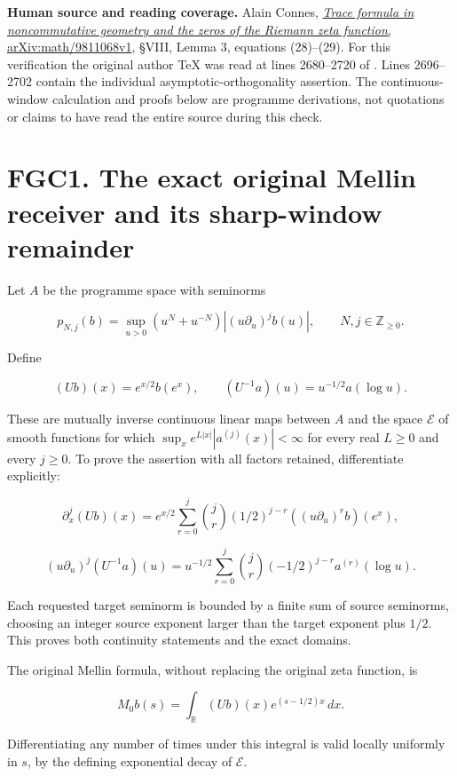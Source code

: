 \textbf{Human source and reading coverage.} Alain Connes,
\href{https://arxiv.org/abs/math/9811068v1}{\emph{Trace formula in
noncommutative geometry and the zeros of the Riemann zeta function},
arXiv:math/9811068v1}, §VIII, Lemma 3, equations (28)--(29). For this
verification the original author TeX was read at lines 2680--2720 of
\href{https://arxiv.org/abs/math/9811068v1}{}.
Lines 2696--2702 contain the individual asymptotic-orthogonality
assertion. The continuous-window calculation and proofs below are
programme derivations, not quotations or claims to have read the entire
source during this check.

\section{FGC1. The exact original Mellin receiver and its sharp-window
remainder}\label{fgc1.-the-exact-original-mellin-receiver-and-its-sharp-window-remainder}

Let \(A\) be the programme space with seminorms

\[
 p_{N,j}(b)=\sup_{u>0}(u^N+u^{-N})|(u\partial_u)^j b(u)|,
 \qquad N,j\in\mathbb Z_{\geq0}.
\]

Define

\[
 (Ub)(x)=e^{x/2}b(e^x),\qquad
 (U^{-1}a)(u)=u^{-1/2}a(\log u).
\tag{FGC1.1}
\]

These are mutually inverse continuous linear maps between \(A\) and the
space \(\mathcal E\) of smooth functions for which
\(\sup_x e^{L|x|}|a^{(j)}(x)|<\infty\) for every real \(L\geq0\) and
every \(j\geq0\). To prove the assertion with all factors retained,
differentiate explicitly:

\[
 \partial_x^j(Ub)(x)
 =e^{x/2}\sum_{r=0}^j\binom jr(1/2)^{j-r}
 ((u\partial_u)^r b)(e^x),
\]

\[
 (u\partial_u)^j(U^{-1}a)(u)
 =u^{-1/2}\sum_{r=0}^j\binom jr(-1/2)^{j-r}a^{(r)}(\log u).
\tag{FGC1.2}
\]

Each requested target seminorm is bounded by a finite sum of source
seminorms, choosing an integer source exponent larger than the target
exponent plus \(1/2\). This proves both continuity statements and the
exact domains.

The original Mellin formula, without replacing the original zeta
function, is

\[
 M_0b(s)=\int_{\mathbb R}(Ub)(x)e^{(s-1/2)x}\,dx.
\tag{FGC1.3}
\]

Differentiating any number of times under this integral is valid locally
uniformly in \(s\), by the defining exponential decay of \(\mathcal E\).

